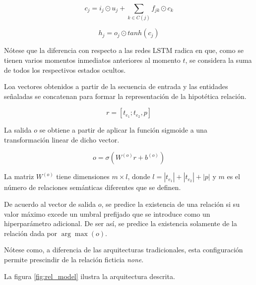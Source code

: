 \begin{equation*}
c_j = i_j \odot u_j + \sum_{k\in C(j)} f_{jk} \odot c_k
\end{equation*}

\begin{equation*}
h_j = o_j \odot tanh(c_j)
\end{equation*}

Nótese que la diferencia con respecto a las redes LSTM radica en que, como se tienen varios momentos inmediatos anteriores al momento $t$, se considera la suma de todos los respectivos estados ocultos.

Loa vectores obtenidos a partir de la secuencia de entrada y las entidades señaladas se concatenan para formar la representación de la hipotética relación.

\begin{equation*}
	r = [t_{e_1};t_{e_2}, p]
\end{equation*}

La salida $o$ se obtiene a partir de aplicar la función sigmoide a una transformación linear de dicho vector.

\begin{equation*}
	o = \sigma(W^{(o)}r + b^{(o)})
\end{equation*}

La matriz $W^{(o)}$ tiene dimensiones $m \times l$, donde $l = |t_{e_1}| + |t_{e_2}| + |p|$ y $m$ es el número de relaciones semánticas diferentes que se definen.

De acuerdo al vector de salida $o$, se predice la existencia de una relación si su valor máximo excede un umbral prefijado que se introduce como un hiperparámetro adicional. De ser así, se predice la existencia solamente de la relación dada por $\arg\max(o)$.
	
Nótese como, a diferencia de las arquitecturas tradicionales, esta configuración permite prescindir de la relación ficticia \textit{none}.

La figura \ref{fig:rel_model} ilustra la arquitectura descrita.

